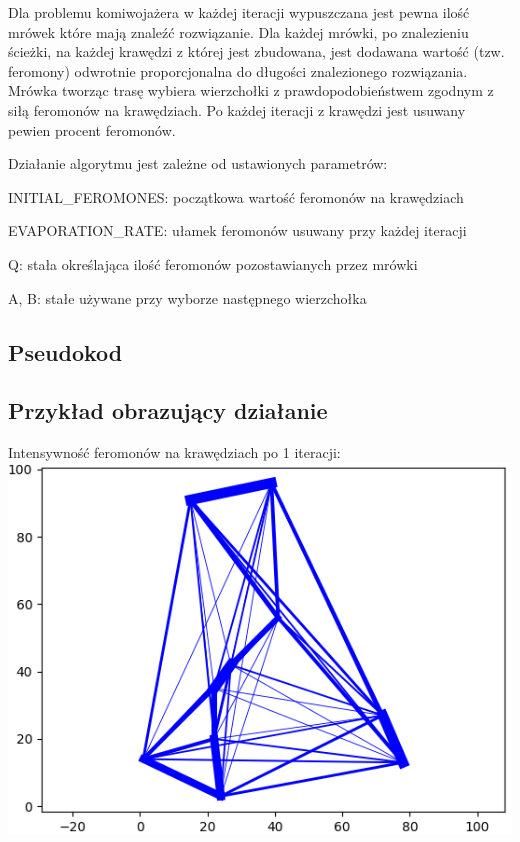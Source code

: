 \documentclass[11pt]{article}
\begin{document}
Dla problemu komiwojażera w każdej iteracji wypuszczana jest pewna ilość mrówek które mają znaleźć rozwiązanie.
Dla każdej mrówki, po znalezieniu ścieżki, na każdej krawędzi z której jest zbudowana, jest dodawana wartość (tzw. feromony) odwrotnie proporcjonalna do długości znalezionego rozwiązania.
Mrówka tworząc trasę wybiera wierzchołki z prawdopodobieństwem zgodnym z siłą feromonów na krawędziach.
Po każdej iteracji z krawędzi jest usuwany pewien procent feromonów.

Działanie algorytmu jest zależne od ustawionych parametrów:
\begin{description}
	\item INITIAL\_FEROMONES: początkowa wartość feromonów na krawędziach
	\item EVAPORATION\_RATE: ułamek feromonów usuwany przy każdej iteracji
	\item Q: stała określająca ilość feromonów pozostawianych przez mrówki
	\item A, B: stałe używane przy wyborze następnego wierzchołka
\end{description}

\subsection{Pseudokod}\label{sub:pseudokod} %




\pagebreak
\subsection{Przykład obrazujący działanie}\label{sub:przyklad} %
Intensywność feromonów na krawędziach po 1 iteracji:\\
\includegraphics[scale=0.5]{images/fer1.png}
\end{document}
